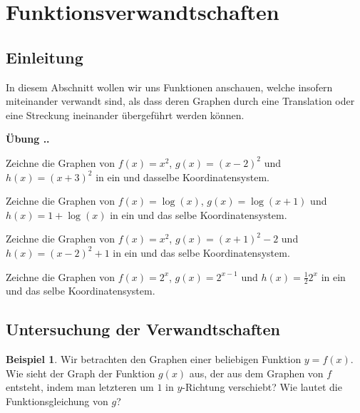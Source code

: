 \documentclass[%
11pt,%
twoside,%
titlepage,%
swissgerman,%
headsepline%
]{scrartcl}
\newcommand{\faEyeLightGray}{\textcolor{lightgray}{\faEye}} %
\theoremstyle{definition}
\newtheorem{bsp}{Beispiel}[subsection] %
\theoremstyle{plain}
\newcommand{\concatueb}[1]{ueb:#1}%
\newcommand{\concatlsg}[1]{lsg:#1}%
\newcounter{uebcounter}[section]
\renewcommand{\theuebcounter}{\thesection.\arabic{uebcounter}}  %
\newenvironment{uebenv}[1]{%
    \refstepcounter{uebcounter}
    \par\noindent\textbf{Übung \theuebcounter.}%
    \label{\concatueb{#1}}\hfill\hyperref[\concatlsg{#1}]{\faEyeLightGray}\par
}{%
    \par
}
\begin{document}
\clearpage

\section{Funktionsverwandtschaften}

\subsection{Einleitung}
 In diesem Abschnitt wollen wir uns Funktionen anschauen, welche insofern miteinander verwandt sind, als dass deren Graphen durch eine Translation oder eine Streckung ineinander übergeführt werden können.

\begin{uebenv}{shiftgraphs}
    Zeichne die Graphen von $f(x)=x^2$, $g(x)=(x-2)^2$ und $h(x)=(x+3)^2$ in ein und dasselbe Koordinatensystem.

    Zeichne die Graphen von $f(x)=\log(x)$, $g(x)=\log(x+1)$ und $h(x)=1+\log(x)$ in ein und das selbe Koordinatensystem.

    Zeichne die Graphen von $f(x)=x^2$, $g(x)=(x+1)^2-2$ und $h(x)=(x-2)^2+1$ in ein und das selbe Koordinatensystem.

    Zeichne die Graphen von $f(x)=2^x$, $g(x)=2^{x-1}$ und $h(x)=\frac{1}{2}2^x$ in ein und das selbe Koordinatensystem.
\end{uebenv}

\subsection{Untersuchung der Verwandtschaften}
  \begin{bsp}
  Wir betrachten den Graphen einer beliebigen Funktion $y=f(x)$. Wie sieht der Graph der Funktion $g(x)$ aus, der aus dem Graphen von $f$ entsteht, indem man letzteren um $1$ in $y$-Richtung verschiebt? Wie lautet die Funktionsgleichung von $g$?\\[-1ex]

\begin{center}
\end{center}
\end{bsp}
\end{document}
